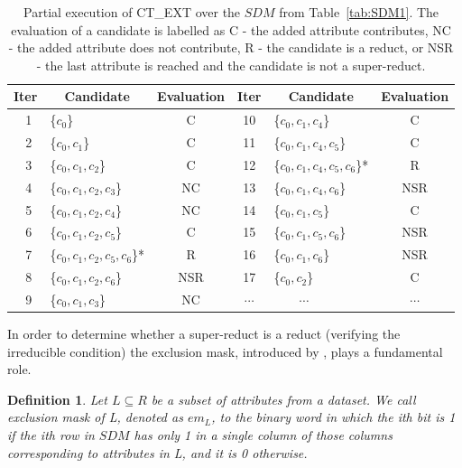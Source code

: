 \documentclass[authoryear,11pt]{elsarticle}
\newtheorem{definition}{Definition}
\begin{document}
	\begin{table}[!htb]
		\caption{Partial execution of CT\_EXT over the $SDM$ from Table~\ref{tab:SDM1}. The evaluation of a
		 		 candidate is labelled as C - the added attribute 
				 contributes, NC - the added attribute does not contribute, R - the candidate is a reduct, or
				 NSR - the last attribute is reached and the candidate is not a super-reduct.}\label{tab:patial}
      	\centering
    		\begin{tabular}{|c|lc|c|lc|}
    		\hline
    		Iter & \multicolumn{1}{c}{Candidate} & \multicolumn{1}{c|}{Evaluation}
    		& Iter & \multicolumn{1}{c}{Candidate} & \multicolumn{1}{c|}{Evaluation}\\
    		\hline
    		~1 & \{$c_0$\} 	 				& C		& 10 & \{$c_0,c_1,c_4$\} 			& C \\	
    		~2 & \{$c_0,c_1$\}				& C 		& 11 & \{$c_0,c_1,c_4,c_5$\}		& C \\
    		~3 & \{$c_0,c_1,c_2$\} 			& C  	& 12 & \{$c_0,c_1,c_4,c_5,c_6$\}*	& R \\
    		~4 & \{$c_0,c_1,c_2,c_3$\}		& NC 	& 13 & \cellcolor[gray]{0.9}\{$c_0,c_1,c_4,c_6$\}	& NSR\\
    		~5 & \{$c_0,c_1,c_2,c_4$\}		& NC 	& 14 & \cellcolor[gray]{0.9}\{$c_0,c_1,c_5$\}		& C \\
    		~6 & \{$c_0,c_1,c_2,c_5$\} 		& C		& 15 & \cellcolor[gray]{0.9}\{$c_0,c_1,c_5,c_6$\} & NSR \\
    		~7 & \{$c_0,c_1,c_2,c_5,c_6$\}*	& R  	& 16 & \cellcolor[gray]{0.9}\{$c_0,c_1,c_6$\}	& NSR \\
    		~8 & \cellcolor[gray]{0.9}\{$c_0,c_1,c_2,c_6$\} 		& NSR 	& 17 & \{$c_0,c_2$\}			& C \\
    		~9 & \{$c_0,c_1,c_3$\}			& NC 	&$\cdots$& ~~~~$\cdots$		& $\cdots$\\
    		\hline
		\end{tabular}
	\end{table}
	
	In order to determine whether a super-reduct is a reduct (verifying the irreducible condition) the
	exclusion mask, introduced by \cite{Lias09}, plays a fundamental role. 
	
	\begin{definition}\label{def:exclusion}
		Let $L \subseteq R$ be a subset of attributes from a dataset. We call exclusion mask of L, denoted as 
		$em_L$, to the binary word in which the ith bit is 1 if the ith row in $SDM$ has only 1 in a single 
		column of those columns corresponding to attributes in L, and it is 0 otherwise.
	\end{definition}
	
\end{document}
